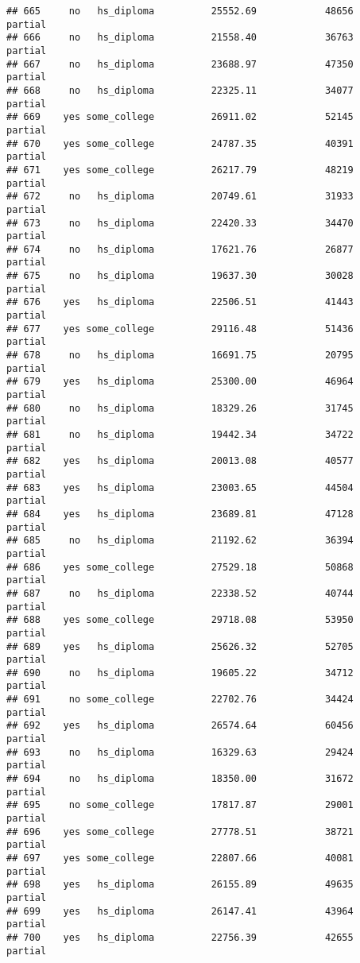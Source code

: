 \documentclass[
]{article}
\begin{document}
\begin{verbatim}
## 665     no   hs_diploma          25552.69            48656     partial
## 666     no   hs_diploma          21558.40            36763     partial
## 667     no   hs_diploma          23688.97            47350     partial
## 668     no   hs_diploma          22325.11            34077     partial
## 669    yes some_college          26911.02            52145     partial
## 670    yes some_college          24787.35            40391     partial
## 671    yes some_college          26217.79            48219     partial
## 672     no   hs_diploma          20749.61            31933     partial
## 673     no   hs_diploma          22420.33            34470     partial
## 674     no   hs_diploma          17621.76            26877     partial
## 675     no   hs_diploma          19637.30            30028     partial
## 676    yes   hs_diploma          22506.51            41443     partial
## 677    yes some_college          29116.48            51436     partial
## 678     no   hs_diploma          16691.75            20795     partial
## 679    yes   hs_diploma          25300.00            46964     partial
## 680     no   hs_diploma          18329.26            31745     partial
## 681     no   hs_diploma          19442.34            34722     partial
## 682    yes   hs_diploma          20013.08            40577     partial
## 683    yes   hs_diploma          23003.65            44504     partial
## 684    yes   hs_diploma          23689.81            47128     partial
## 685     no   hs_diploma          21192.62            36394     partial
## 686    yes some_college          27529.18            50868     partial
## 687     no   hs_diploma          22338.52            40744     partial
## 688    yes some_college          29718.08            53950     partial
## 689    yes   hs_diploma          25626.32            52705     partial
## 690     no   hs_diploma          19605.22            34712     partial
## 691     no some_college          22702.76            34424     partial
## 692    yes   hs_diploma          26574.64            60456     partial
## 693     no   hs_diploma          16329.63            29424     partial
## 694     no   hs_diploma          18350.00            31672     partial
## 695     no some_college          17817.87            29001     partial
## 696    yes some_college          27778.51            38721     partial
## 697    yes some_college          22807.66            40081     partial
## 698    yes   hs_diploma          26155.89            49635     partial
## 699    yes   hs_diploma          26147.41            43964     partial
## 700    yes   hs_diploma          22756.39            42655     partial

\end{verbatim}
\end{document}
